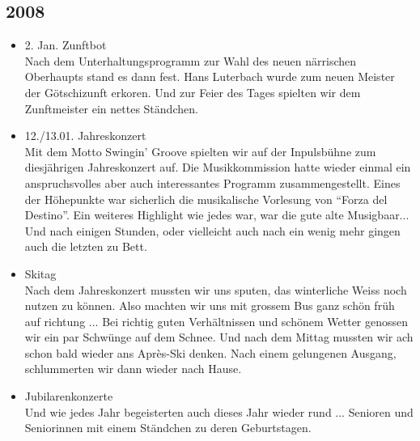 \subsection*{2008}

\begin{history}


      \begin{itemize}

            \item 2. Jan. Zunftbot\\
                  Nach dem Unterhaltungsprogramm zur Wahl des neuen närrischen Oberhaupts
                  stand es dann fest. Hans Luterbach wurde zum neuen Meister der
                  Götschizunft erkoren. Und zur Feier des Tages spielten wir dem
                  Zunftmeister ein nettes Ständchen.

            \item 12./13.01. Jahreskonzert\\

                  Mit dem Motto Swingin' Groove spielten wir auf der Inpulsbühne zum
                  diesjährigen Jahreskonzert auf. Die Musikkommission hatte wieder einmal
                  ein anspruchsvolles aber auch interessantes Programm zusammengestellt.
                  Eines der Höhepunkte war sicherlich die musikalische Vorlesung von
                  \enquote{Forza del Destino}. Ein weiteres Highlight wie jedes war, war
                  die gute alte Musigbaar... Und nach einigen Stunden, oder vielleicht
                  auch nach ein wenig mehr gingen auch die letzten zu Bett.

            \item Skitag\\
                  Nach dem Jahreskonzert mussten wir uns sputen, das winterliche Weiss
                  noch nutzen zu können. Also machten wir uns mit grossem Bus ganz schön
                  früh auf richtung ... Bei richtig guten Verhältnissen und schönem Wetter
                  genossen wir ein par Schwünge auf dem Schnee. Und nach dem Mittag
                  mussten wir ach schon bald wieder ans Après-Ski denken. Nach einem
                  gelungenen Ausgang, schlummerten wir dann wieder nach Hause.

            \item Jubilarenkonzerte\\
                  Und wie jedes Jahr begeisterten auch dieses Jahr wieder rund ...
                  Senioren und Seniorinnen mit einem Ständchen zu deren Geburtstagen.


\end{itemize}
\end{history}
